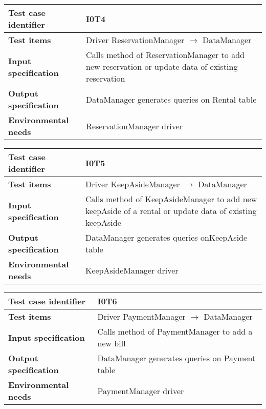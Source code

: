 \documentclass{scrreprt}
\begin{document}
\begin{center}
\begin{tabularx}{\columnwidth}{>{\bfseries}lX}
\toprule
Test case identifier & I0T4\\
\midrule
Test items & Driver ReservationManager $\longrightarrow$ DataManager\\
\midrule
Input specification & Calls method of ReservationManager to add new reservation or update data of existing reservation \\
\midrule
Output specification & DataManager generates queries on Rental table \\
\midrule
Environmental needs & ReservationManager driver\\
\bottomrule
\end{tabularx}
\end{center}



\begin{center}
\begin{tabularx}{\columnwidth}{>{\bfseries}lX}
\toprule
Test case identifier & I0T5\\
\midrule
Test items & Driver KeepAsideManager $\longrightarrow$ DataManager\\
\midrule
Input specification & Calls method of KeepAsideManager to add new keepAside of a rental or update data of existing keepAside \\
\midrule
Output specification & DataManager generates queries onKeepAside table \\
\midrule
Environmental needs & KeepAsideManager driver\\
\bottomrule
\end{tabularx}
\end{center}

\begin{center}
\begin{tabularx}{\columnwidth}{>{\bfseries}lX}
\toprule
Test case identifier & I0T6\\
\midrule
Test items & Driver PaymentManager $\longrightarrow$ DataManager\\
\midrule
Input specification & Calls method of PaymentManager to add a new bill \\
\midrule
Output specification & DataManager generates queries on Payment table \\
\midrule
Environmental needs & PaymentManager driver\\
\bottomrule
\end{tabularx}
\end{center}
\end{document}
